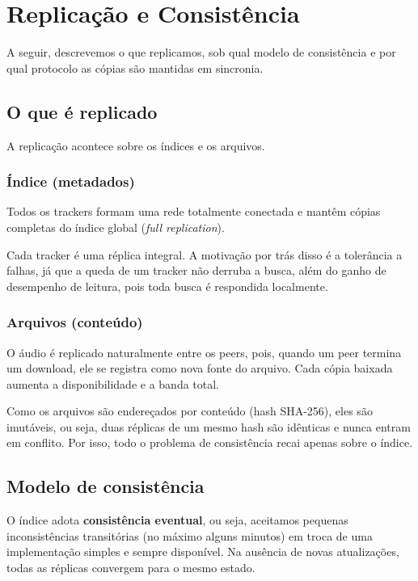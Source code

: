 \documentclass[12pt, a4paper]{article}
\begin{document}
\section{Replicação e Consistência}\label{sec:replicacao}

A seguir, descrevemos o que replicamos, sob qual modelo de consistência e por qual protocolo as cópias são mantidas em sincronia.

\subsection{O que é replicado}\label{sec:rep-oque}

A replicação acontece sobre os índices e os arquivos.

\subsubsection*{Índice (metadados)} 
Todos os trackers formam uma rede totalmente conectada e mantêm cópias completas do índice global (\textit{full replication}). 

Cada tracker é uma réplica integral. A motivação por trás disso é a tolerância a falhas, já que a queda de um tracker não derruba a busca, além do ganho de desempenho de leitura, pois toda busca é respondida localmente.

\subsubsection*{Arquivos (conteúdo)} 
O áudio é replicado naturalmente entre os peers, pois, quando um peer termina um download, ele se registra como nova fonte do arquivo. Cada cópia baixada aumenta a disponibilidade e a banda total.

Como os arquivos são endereçados por conteúdo (hash SHA-256), eles são imutáveis, ou seja, duas réplicas de um mesmo hash são idênticas e nunca entram em conflito. Por isso, todo o problema de consistência recai apenas sobre o índice.

\subsection{Modelo de consistência}\label{sec:modelo_consistencia}

O índice adota \textbf{consistência eventual}, ou seja, aceitamos pequenas inconsistências transitórias (no máximo alguns minutos) em troca de uma implementação simples e sempre disponível. Na ausência de novas atualizações, todas as réplicas convergem para o mesmo estado.
\end{document}
